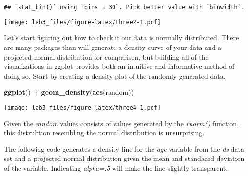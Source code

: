 \documentclass[]{article}
\newenvironment{Shaded}{\begin{snugshade}}{\end{snugshade}}
\newcommand{\KeywordTok}[1]{\textcolor[rgb]{0.13,0.29,0.53}{\textbf{#1}}}
\newcommand{\DataTypeTok}[1]{\textcolor[rgb]{0.13,0.29,0.53}{#1}}
\newcommand{\DecValTok}[1]{\textcolor[rgb]{0.00,0.00,0.81}{#1}}
\newcommand{\StringTok}[1]{\textcolor[rgb]{0.31,0.60,0.02}{#1}}
\newcommand{\OperatorTok}[1]{\textcolor[rgb]{0.81,0.36,0.00}{\textbf{#1}}}
\newcommand{\NormalTok}[1]{#1}
\begin{document}
\begin{verbatim}
## `stat_bin()` using `bins = 30`. Pick better value with `binwidth`.
\end{verbatim}

\texttt{[image: lab3\_files/figure-latex/three2-1.pdf]}

Let's start figuring out how to check if our data is normally
distributed. There are many packages than will generate a density curve
of your data and a projected normal distribution for comparison, but
building all of the visualizations in ggplot provides both an intuitive
and informative method of doing so. Start by creating a density plot of
the randomly generated data.

\begin{Shaded}
\begin{Highlighting}[]
\KeywordTok{ggplot}\NormalTok{() }\OperatorTok{+}
\StringTok{  }\KeywordTok{geom_density}\NormalTok{(}\KeywordTok{aes}\NormalTok{(random))}
\end{Highlighting}
\end{Shaded}

\texttt{[image: lab3\_files/figure-latex/three4-1.pdf]}

Given the \emph{random} values consists of values generated by the
\emph{rnorm()} function, this distrubtion resembling the normal
distribution is unsurprising.

The following code generates a density line for the \emph{age} variable
from the \emph{ds} data set and a projected normal distribution given
the mean and standaard deviation of the variable. Indicating
\emph{alpha=.5} will make the line slightly transparent.

\begin{Shaded}
\end{Shaded}
\end{document}
